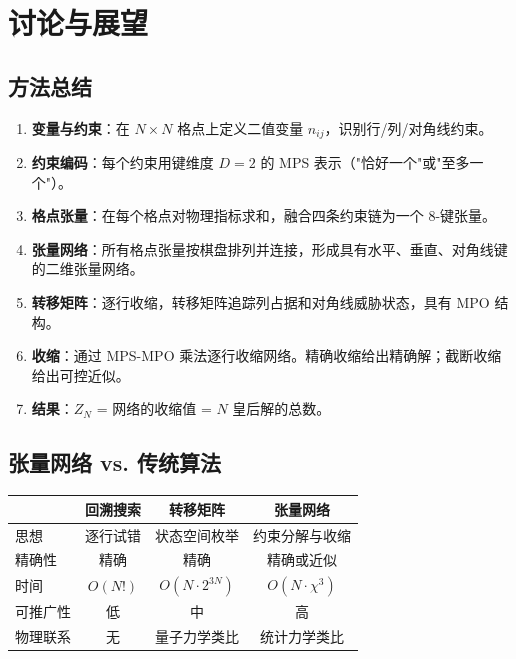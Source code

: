 \documentclass[12pt,a4paper]{ctexart}
\begin{document}
\section{讨论与展望}

\subsection{方法总结}

\begin{tcolorbox}[colback=blue!5, colframe=blue!60!black, title=\textbf{$N$ 皇后问题的张量网络解法：完整流程}]
\begin{enumerate}
    \item \textbf{变量与约束}：在 $N \times N$ 格点上定义二值变量 $n_{ij}$，识别行/列/对角线约束。
    \item \textbf{约束编码}：每个约束用键维度 $D=2$ 的 MPS 表示（"恰好一个"或"至多一个"）。
    \item \textbf{格点张量}：在每个格点对物理指标求和，融合四条约束链为一个 8-键张量。
    \item \textbf{张量网络}：所有格点张量按棋盘排列并连接，形成具有水平、垂直、对角线键的二维张量网络。
    \item \textbf{转移矩阵}：逐行收缩，转移矩阵追踪列占据和对角线威胁状态，具有 MPO 结构。
    \item \textbf{收缩}：通过 MPS-MPO 乘法逐行收缩网络。精确收缩给出精确解；截断收缩给出可控近似。
    \item \textbf{结果}：$Z_N$ = 网络的收缩值 = $N$ 皇后解的总数。
\end{enumerate}
\end{tcolorbox}

\subsection{张量网络 vs. 传统算法}

\begin{center}
\renewcommand{\arraystretch}{1.3}
\begin{tabular}{l|ccc}
\hline
& \textbf{回溯搜索} & \textbf{转移矩阵} & \textbf{张量网络} \\
\hline
思想 & 逐行试错 & 状态空间枚举 & 约束分解与收缩 \\
精确性 & 精确 & 精确 & 精确或近似 \\
时间 & $O(N!)$ & $O(N \cdot 2^{3N})$ & $O(N \cdot \chi^3)$ \\
可推广性 & 低 & 中 & 高 \\
物理联系 & 无 & 量子力学类比 & 统计力学类比 \\
\hline
\end{tabular}
\end{center}
\end{document}
